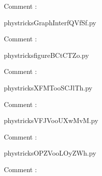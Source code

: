     Comment : 

    \clearpage
    


    \newcommand{\CaptionFigGraphInterfQVfSf}{<+Type your caption here+>}
    \begin{center}
        
    \end{center}
    phystricksGraphInterfQVfSf.py

    Comment : 

    \clearpage
    


    \newcommand{\CaptionFigfigureBCtCTZo}{<+Type your caption here+>}
    \begin{center}
        
    \end{center}
    phystricksfigureBCtCTZo.py

    Comment : 

    \clearpage
    


    \newcommand{\CaptionFigXFMTooSCJlTh}{<+Type your caption here+>}
    \begin{center}
        
    \end{center}
    phystricksXFMTooSCJlTh.py

    Comment : 

    \clearpage
    


    \newcommand{\CaptionFigVFJVooUXwMvM}{<+Type your caption here+>}
    \begin{center}
        
    \end{center}
    phystricksVFJVooUXwMvM.py

    Comment : 

    \clearpage
    


    \newcommand{\CaptionFigOPZVooLOyZWh}{<+Type your caption here+>}
    \begin{center}
        
    \end{center}
    phystricksOPZVooLOyZWh.py

    Comment : 


